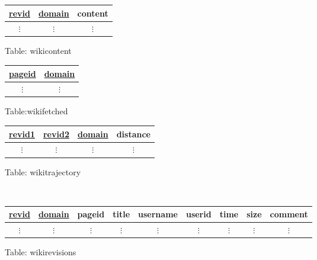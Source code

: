 \begin{figure}
  \vspace{10mm}
  \centering
  \begin{subfigure}[t]{0.3\linewidth}
    \centering
    \begin{tabular}{ccc}
      \toprule
      \underline{revid} & \underline{domain} & content\\
      \midrule
      $\vdots$ & $\vdots$ & $\vdots$\\
    \end{tabular}
    \caption{Table: wikicontent}
  \end{subfigure}
  \begin{subfigure}[t]{0.2\linewidth}
    \centering
    \begin{tabular}{cc}
      \toprule
      \underline{pageid} & \underline{domain} \\
      \midrule
      $\vdots$ & $\vdots$\\
    \end{tabular}
    \caption{Table:\newline wikifetched}
  \end{subfigure}
  \begin{subfigure}[t]{0.4\linewidth}
    \centering
    \begin{tabular}{cccc}
      \toprule
      \underline{revid1} & \underline{revid2} & \underline{domain} & distance\\
      \midrule
      $\vdots$ & $\vdots$ & $\vdots$ & $\vdots$ \\
    \end{tabular}
    \caption{Table: wikitrajectory}
  \end{subfigure}\\
  \vspace{10 mm}
  \begin{subfigure}[b!]{\linewidth}
    \centering
    \begin{tabular}{ccccccccc}
      \toprule
      \underline{revid} & \underline{domain} & pageid & title & username & userid & time & size &
      comment \\ 
      \midrule
      $\vdots$ & $\vdots$ & $\vdots$ & $\vdots$ & $\vdots$ & $\vdots$ & $\vdots$
      & $\vdots$ & $\vdots$ \\
    \end{tabular}
    \caption{Table: wikirevisions}
  \end{subfigure}\\
  \vspace{10mm}
  \begin{subfigure}[b!]{\linewidth}

\end{subfigure}
\end{figure}
